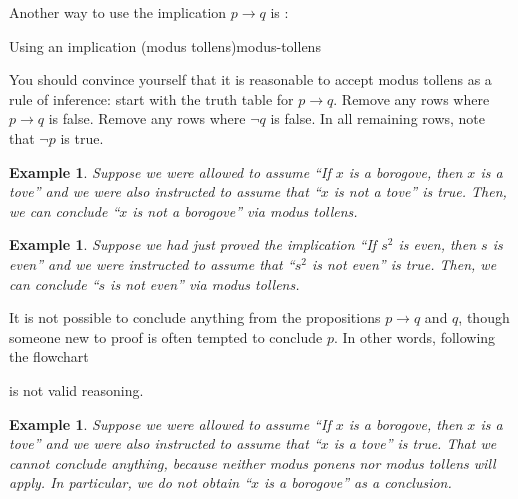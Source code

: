 \documentclass{book}
\newcounter{ekcounter}%
\theoremstyle{ekimcustom}
\newtheorem{example}[ekcounter]{Example}
\newcommand\defn[1]{{\color{blue}{\bf #1}}}
\begin{document}
Another way to use the implication $p \rightarrow q$ is \defn{modus tollens}:
\begin{bmethod}{Using an implication (modus tollens)}{modus-tollens}
\begin{center}
\end{center}
\end{bmethod}
You should convince yourself that it is reasonable to accept modus tollens as a rule of inference: start with the truth table for $p \rightarrow q$. Remove any rows where $p \rightarrow q$ is false. Remove any rows where $\neg q$ is false. In all remaining rows, note that $\neg p$ is true.
\begin{example}
Suppose we were allowed to assume ``If $x$ is a borogove, then $x$ is a tove'' and we were also instructed to assume that ``$x$ is not a tove'' is true. Then, we can conclude ``$x$ is not a borogove'' via modus tollens.
\end{example}
\begin{example}
Suppose we had just proved the implication ``If $s^2$ is even, then $s$ is even'' and we were instructed to assume that ``$s^2$ is not even'' is true. Then, we can conclude ``$s$ is not even'' via modus tollens.
\end{example}
\begin{bwarning}{}{}
It is not possible to conclude anything from the propositions $p \rightarrow q$ and $q$, though someone new to proof is often tempted to conclude $p$. In other words, following the flowchart
\begin{center}
\end{center}
is not valid reasoning.
\end{bwarning}
\begin{example}
Suppose we were allowed to assume ``If $x$ is a borogove, then $x$ is a tove'' and we were also instructed to assume that ``$x$ is a tove'' is true. 
That we cannot conclude anything, because neither modus ponens nor modus tollens will apply. In particular, we do not obtain ``$x$ is a borogove'' as a conclusion.
\end{example}
\end{document}
